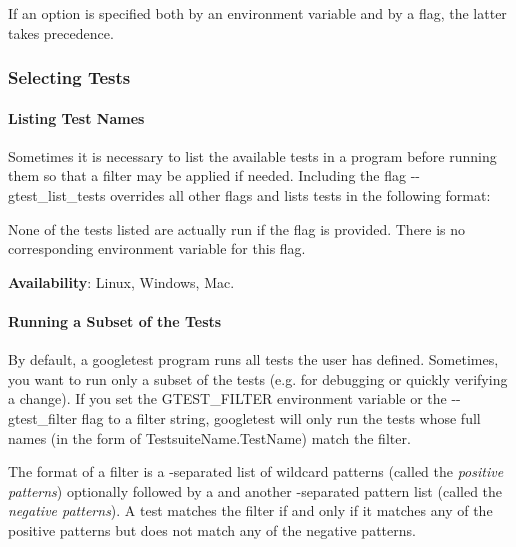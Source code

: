 If an option is specified both by an environment variable and by a flag, the latter takes precedence.

\subsubsection*{Selecting Tests}

\paragraph*{Listing Test Names}

Sometimes it is necessary to list the available tests in a program before running them so that a filter may be applied if needed. Including the flag {\ttfamily -\/-\/gtest\+\_\+list\+\_\+tests} overrides all other flags and lists tests in the following format\+:


\begin{DoxyCode}{0}
\end{DoxyCode}


None of the tests listed are actually run if the flag is provided. There is no corresponding environment variable for this flag.

{\bfseries{Availability}}\+: Linux, Windows, Mac.

\paragraph*{Running a Subset of the Tests}

By default, a googletest program runs all tests the user has defined. Sometimes, you want to run only a subset of the tests (e.\+g. for debugging or quickly verifying a change). If you set the {\ttfamily G\+T\+E\+S\+T\+\_\+\+F\+I\+L\+T\+ER} environment variable or the {\ttfamily -\/-\/gtest\+\_\+filter} flag to a filter string, googletest will only run the tests whose full names (in the form of {\ttfamily Testsuite\+Name.\+Test\+Name}) match the filter.

The format of a filter is a \textquotesingle{}{\ttfamily \+:}\textquotesingle{}-\/separated list of wildcard patterns (called the {\itshape positive patterns}) optionally followed by a \textquotesingle{}{\ttfamily -\/}\textquotesingle{} and another \textquotesingle{}{\ttfamily \+:}\textquotesingle{}-\/separated pattern list (called the {\itshape negative patterns}). A test matches the filter if and only if it matches any of the positive patterns but does not match any of the negative patterns.

